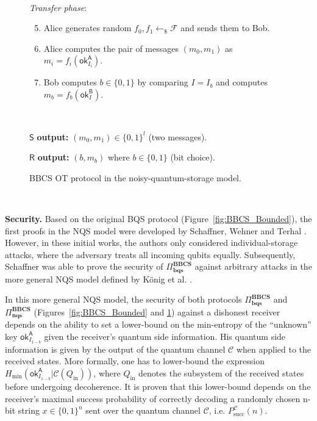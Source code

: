 \begin{figure}[h!]
\begin{tcolorbox}
    \
    
    \textit{Transfer phase}:
            \begin{enumerate}
            \setcounter{enumi}{4}
                \item Alice generates random $f_0, f_1 \leftarrow_{\$}\mathcal{F}$ and sends them to Bob.
                \item Alice computes the pair of messages $(m_0, m_1)$ as $m_i = f_i(\mathsf{ok}^{\mathsf{A}}_{I_{i}})$.
                \item Bob computes $b\in\{0, 1\}$ by comparing $I = I_b$ and computes $m_b = f_b(\mathsf{ok}^{\mathsf{B}}_{I})$. 
            \end{enumerate}
    
    
   
    
    \
    
$\mathsf{S}$ \textbf{output:} $(m_0, m_1)\in\{0,1\}^l$ (two messages).

$\mathsf{R}$ \textbf{output:} $(b, m_b)$ where $b\in\{0,1\}$ (bit choice).
    
\end{tcolorbox}
    \caption{BBCS OT protocol in the noisy-quantum-storage model.}
    \label{fig:BBCS_Noisy}
\end{figure}


\

\noindent\textbf{Security.} Based on the original BQS protocol (Figure~\ref{fig:BBCS_Bounded}), the first proofs in the NQS model were developed by Schaffner, Wehner and Terhal \cite{WST08, STW09}. However, in these initial works, the authors only considered individual-storage attacks, where the adversary treats all incoming qubits equally. Subsequently, Schaffner \cite{S10} was able to prove the security of $\Pi^{\textbf{BBCS}}_{\textbf{bqs}}$ against arbitrary attacks in the more general NQS model defined by K\"onig et al. \cite{KWW12}. 

In this more general NQS model, the security of both protocols $\Pi^{\textbf{BBCS}}_{\textbf{bqs}}$ and $\Pi^{\textbf{BBCS}}_{\textbf{nqs}}$ (Figures~\ref{fig:BBCS_Bounded} and \ref{fig:BBCS_Noisy}) against a dishonest receiver depends on the ability to set a lower-bound on the min-entropy of the ``unknown'' key $\mathsf{ok}^{\mathsf{A}}_{I_{1-b}}$ given the receiver's quantum side information. His quantum side information is given by the output of the quantum channel $\mathcal{C}$ when applied to the received states. More formally, one has to lower-bound the expression $H_{\text{min}}\left(\mathsf{ok}^{\mathsf{A}}_{I_{1-b}} | \mathcal{C}\left(Q_{\text{in}}\right)\right)$, where $Q_{\text{in}}$ denotes the subsystem of the received states before undergoing decoherence. It is proven \cite{KWW12} that this lower-bound depends on the receiver's maximal success probability of correctly decoding a randomly chosen n-bit string $x \in \{0,1\}^n$ sent over the quantum
channel $\mathcal{C}$, i.e. $P^{\mathcal{C}}_{\text{succ}}(n)$. %

